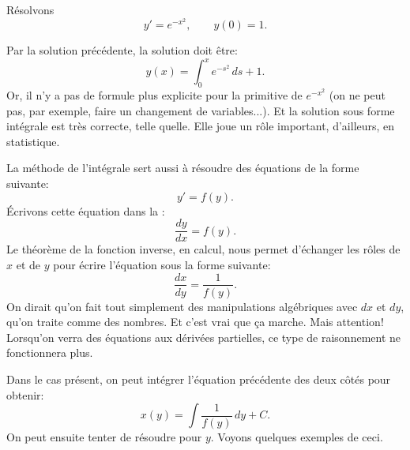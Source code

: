 \begin{example}
	Résolvons
	\begin{equation*}
		y' = e^{-x^2}, \qquad y(0) = 1 .
	\end{equation*}

	Par la solution précédente, la solution doit être:
	\begin{equation*}
		y(x) = \int_0^x e^{-s^2} \,ds + 1 .
	\end{equation*}
	Or, il n'y a pas de formule plus explicite pour la primitive de $e^{-x^2}$
	(on ne peut pas, par exemple, faire un changement de variables...).
	Et la solution sous forme intégrale est très correcte, telle quelle.
	Elle joue un rôle important, d'ailleurs, en statistique.
\end{example}

La méthode de l'intégrale sert aussi à résoudre des équations de la forme suivante:
\begin{equation*}
	y' = f(y) .
\end{equation*}
Écrivons cette équation dans la :
\begin{equation*}
	\frac{dy}{dx} = f(y) .
\end{equation*}
Le théorème de la fonction inverse, en calcul, nous permet d'échanger les rôles de $x$ et de $y$ pour écrire l'équation sous la forme suivante:
\begin{equation*}
	\frac{dx}{dy} = \frac{1}{f(y)} .
\end{equation*}
On dirait qu'on fait tout simplement des manipulations algébriques avec $dx$ et $dy$, qu'on traite comme des nombres.
Et c'est vrai que ça marche.
Mais attention! Lorsqu'on verra des équations aux dérivées partielles, ce type de raisonnement ne fonctionnera plus.

Dans le cas présent, on peut intégrer l'équation précédente des deux côtés pour obtenir:
\begin{equation*}
	x(y) = \int \frac{1}{f(y)} \,dy + C .
\end{equation*}
On peut ensuite tenter de résoudre pour $y$.  Voyons quelques exemples de ceci.

